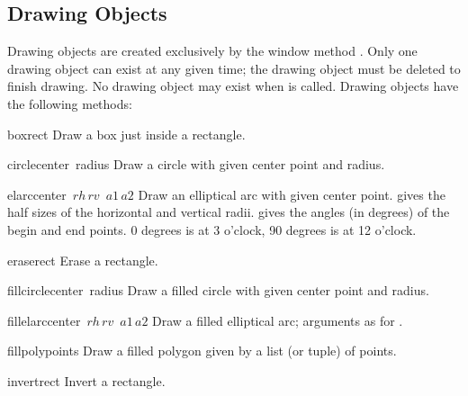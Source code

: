 \subsection{Drawing Objects}

Drawing objects are created exclusively by the window method
.
Only one drawing object can exist at any given time; the drawing object
must be deleted to finish drawing.
No drawing object may exist when
is called.
Drawing objects have the following methods:

\renewcommand{\indexsubitem}{(drawing method)}

\begin{funcdesc}{box}{rect}
Draw a box just inside a rectangle.
\end{funcdesc}

\begin{funcdesc}{circle}{center\, radius}
Draw a circle with given center point and radius.
\end{funcdesc}

\begin{funcdesc}{elarc}{center\, \(rh\, rv\)\, \(a1\, a2\)}
Draw an elliptical arc with given center point.
gives the half sizes of the horizontal and vertical radii.
gives the angles (in degrees) of the begin and end points.
0 degrees is at 3 o'clock, 90 degrees is at 12 o'clock.
\end{funcdesc}

\begin{funcdesc}{erase}{rect}
Erase a rectangle.
\end{funcdesc}

\begin{funcdesc}{fillcircle}{center\, radius}
Draw a filled circle with given center point and radius.
\end{funcdesc}

\begin{funcdesc}{fillelarc}{center\, \(rh\, rv\)\, \(a1\, a2\)}
Draw a filled elliptical arc; arguments as for .
\end{funcdesc}

\begin{funcdesc}{fillpoly}{points}
Draw a filled polygon given by a list (or tuple) of points.
\end{funcdesc}

\begin{funcdesc}{invert}{rect}
Invert a rectangle.
\end{funcdesc}

